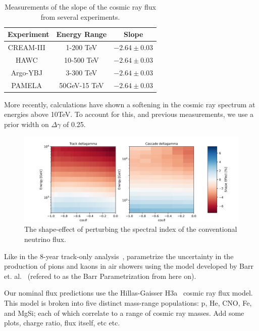 \documentclass[main.tex]{subfiles}
\begin{document}
\begin{table}
    \centering
    \begin{tabular}{|c | cc|}\hline
        Experiment & Energy Range & Slope \\\hline
        CREAM-III~\cite{Yoon_2017} & 1-200 TeV & $-2.64\pm 0.03$ \\
        HAWC~\cite{PhysRevD.96.122001} & 10-500 TeV & $-2.64\pm 0.03$ \\
        Argo-YBJ~\cite{IACOVACCI2013157} & 3-300 TeV & $-2.64\pm 0.03$ \\
        PAMELA~\cite{astra-7-235-2011} & 50GeV-15 TeV & $-2.64\pm 0.03$ \\\hline
    \end{tabular}
    \caption{Measurements of the slope of the cosmic ray flux from several experiments.}\label{tab:spectral}
\end{table}

More recently, calculations have shown a softening in the cosmic ray spectrum at energies above 10TeV\cite{LIPARI2020102441}. 
To account for this, and previous measurements, we use a prior width on $\Delta \gamma$ of 0.25. 

\begin{figure}
    \centering
    \includegraphics[width=0.8\linewidth]{figures/systematics/deltagamma.png}
    \caption{The shape-effect of perturbing the spectral index of the conventional neutrino flux.}
\end{figure}


Like in the 8-year track-only analysis~\cite{Aartsen_2020,Aartsen_2020_prd}, parametrize the uncertainty in the production of pions and kaons in air showers using the model developed by Barr et. al.~\cite{PhysRevD.74.094009} (refered to as the Barr Parametrization from here on). 

Our nominal flux predictions use the Hillas-Gaisser H3a~\cite{GAISSER2012801} cosmic ray flux model. 
This model is broken into five distinct mass-range populations: p, He, CNO, Fe, and MgSi; each of which correlate to a range of cosmic ray masses. 
Add some plots, charge ratio, flux itself, etc etc.
\end{document}
